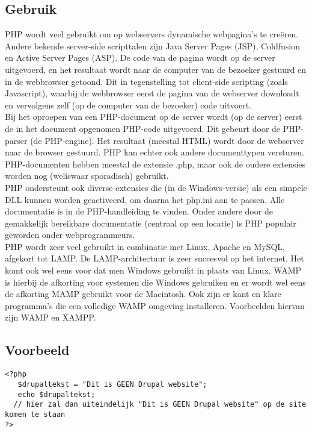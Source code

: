 \subsection{Gebruik}
PHP wordt veel gebruikt om op webservers dynamische webpagina's te
cre\"eren. Andere bekende server-side scripttalen zijn Java Server Pages (JSP), Coldfusion en Active Server Pages (ASP). De code van de pagina wordt op de server uitgevoerd, 
en het resultaat wordt naar de computer van de bezoeker gestuurd en in de webbrowser getoond. Dit in tegenstelling tot 
client-side scripting (zoals Javascript), waarbij de webbrowser eerst de pagina van de webserver downloadt en vervolgens 
zelf (op de computer van de bezoeker) code uitvoert.
\\
Bij het oproepen van een PHP-document op de server wordt (op de server) eerst de in het document opgenomen PHP-code uitgevoerd. 
Dit gebeurt door de PHP-parser (de PHP-engine). Het resultaat (meestal HTML) wordt door de webserver naar de browser gestuurd. 
PHP kan echter ook andere documenttypen versturen. PHP-documenten hebben meestal de extensie .php, maar ook de oudere extensies 
worden nog (weliswaar sporadisch) gebruikt.
\\
PHP ondersteunt ook diverse extensies die (in de Windows-versie) als een simpele DLL kunnen worden geactiveerd, om daarna het 
php.ini aan te passen. Alle documentatie is in de PHP-handleiding te vinden. Onder andere door de gemakkelijk bereikbare 
documentatie (centraal op een locatie) is PHP populair geworden onder webprogrammeurs.
\\
PHP wordt zeer veel gebruikt in combinatie met Linux, Apache en MySQL, afgekort tot LAMP. De LAMP-architectuur is zeer succesvol 
op het internet. Het komt ook wel eens voor dat men Windows gebruikt in plaats van Linux. WAMP is hierbij de afkorting voor 
systemen die Windows gebruiken en er wordt wel eens de afkorting MAMP gebruikt voor de Macintosh. Ook zijn er kant en klare 
programma's die een volledige WAMP omgeving installeren. Voorbeelden hiervan zijn WAMP en XAMPP.

\subsection{Voorbeeld}
\begin{verbatim}
<?php
   $drupaltekst = "Dit is GEEN Drupal website";
   echo $drupaltekst;
  // hier zal dan uiteindelijk "Dit is GEEN Drupal website" op de site komen te staan
?>
\end{verbatim}

